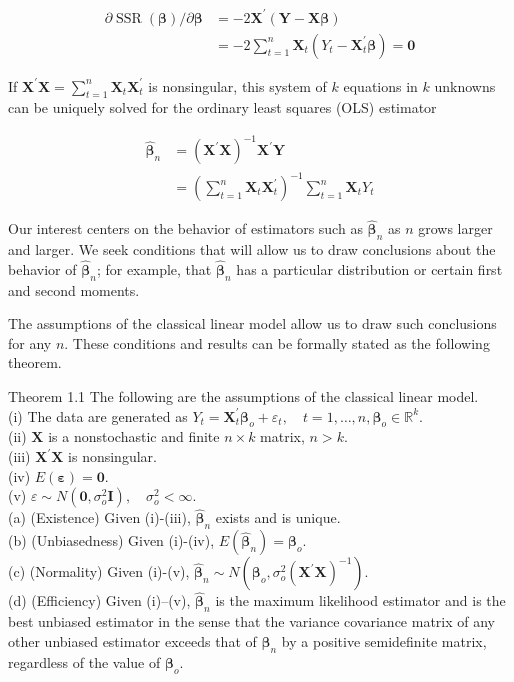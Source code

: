 \documentclass[10pt]{article}
\begin{document}
$$
\begin{aligned}
\partial \operatorname{SSR}(\boldsymbol{\beta}) / \partial \boldsymbol{\beta} & =-2 \mathbf{X}^{\prime}(\mathbf{Y}-\mathbf{X} \boldsymbol{\beta}) \\
& =-2 \sum_{t=1}^{n} \mathbf{X}_{t}\left(Y_{t}-\mathbf{X}_{t}^{\prime} \boldsymbol{\beta}\right)=\mathbf{0}
\end{aligned}
$$

If $\mathbf{X}^{\prime} \mathbf{X}=\sum_{t=1}^{n} \mathbf{X}_{t} \mathbf{X}_{t}^{\prime}$ is nonsingular, this system of $k$ equations in $k$ unknowns can be uniquely solved for the ordinary least squares (OLS) estimator

$$
\begin{aligned}
\hat{\boldsymbol{\beta}}_{n} & =\left(\mathbf{X}^{\prime} \mathbf{X}\right)^{-1} \mathbf{X}^{\prime} \mathbf{Y} \\
& =\left(\sum_{t=1}^{n} \mathbf{X}_{t} \mathbf{X}_{t}^{\prime}\right)^{-1} \sum_{t=1}^{n} \mathbf{X}_{t} Y_{t}
\end{aligned}
$$

Our interest centers on the behavior of estimators such as $\hat{\boldsymbol{\beta}}_{n}$ as $n$ grows larger and larger. We seek conditions that will allow us to draw conclusions about the behavior of $\hat{\boldsymbol{\beta}}_{n}$; for example, that $\hat{\boldsymbol{\beta}}_{n}$ has a particular distribution or certain first and second moments.

The assumptions of the classical linear model allow us to draw such conclusions for any $n$. These conditions and results can be formally stated as the following theorem.

Theorem 1.1 The following are the assumptions of the classical linear model.\\
(i) The data are generated as $Y_{t}=\mathbf{X}_{t}^{\prime} \boldsymbol{\beta}_{o}+\varepsilon_{t}, \quad t=1, \ldots, n, \boldsymbol{\beta}_{o} \in \mathbb{R}^{k}$.\\
(ii) $\mathbf{X}$ is a nonstochastic and finite $n \times k$ matrix, $n>k$.\\
(iii) $\mathbf{X}^{\prime} \mathbf{X}$ is nonsingular.\\
(iv) $E(\boldsymbol{\varepsilon})=\mathbf{0}$.\\
(v) $\varepsilon \sim N\left(\mathbf{0}, \sigma_{o}^{2} \mathbf{I}\right), \quad \sigma_{o}^{2}<\infty$.\\
(a) (Existence) Given (i)-(iii), $\hat{\boldsymbol{\beta}}_{n}$ exists and is unique.\\
(b) (Unbiasedness) Given (i)-(iv), $E\left(\hat{\boldsymbol{\beta}}_{n}\right)=\boldsymbol{\beta}_{o}$.\\
(c) (Normality) Given (i)-(v), $\hat{\boldsymbol{\beta}}_{n} \sim N\left(\boldsymbol{\beta}_{o}, \sigma_{o}^{2}\left(\mathbf{X}^{\prime} \mathbf{X}\right)^{-1}\right)$.\\
(d) (Efficiency) Given (i)--(v), $\hat{\boldsymbol{\beta}}_{n}$ is the maximum likelihood estimator and is the best unbiased estimator in the sense that the variance covariance matrix of any other unbiased estimator exceeds that of $\hat{\boldsymbol{\beta}}_{n}$ by a positive semidefinite matrix, regardless of the value of $\boldsymbol{\beta}_{o}$.
\end{document}
